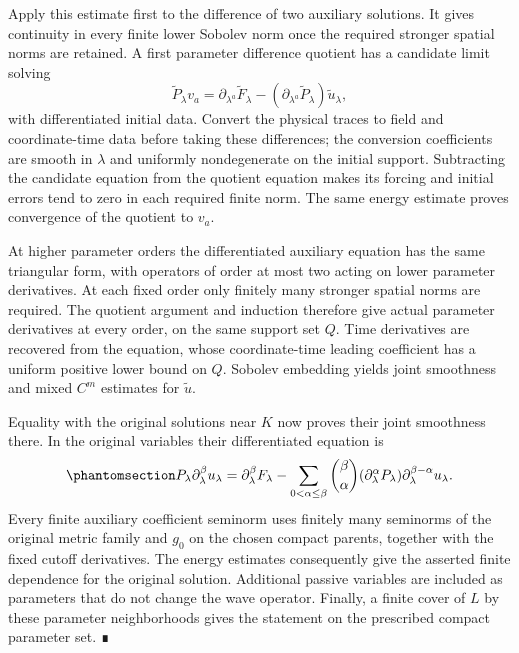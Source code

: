 \documentclass[
  english,
  11pt,
  reqno]{amsart}
\begin{document}
Apply this estimate first to the difference of two auxiliary solutions.
It gives continuity in every finite lower Sobolev norm once the required
stronger spatial norms are retained. A first parameter difference
quotient has a candidate limit solving \[
\widetilde P_\lambda v_a
=\partial_{\lambda^a}\widetilde F_\lambda
-(\partial_{\lambda^a}\widetilde P_\lambda)
\widetilde u_\lambda,
\] with differentiated initial data. Convert the physical traces to
field and coordinate-time data before taking these differences; the
conversion coefficients are smooth in \(\lambda\) and uniformly
nondegenerate on the initial support. Subtracting the candidate equation
from the quotient equation makes its forcing and initial errors tend to
zero in each required finite norm. The same energy estimate proves
convergence of the quotient to \(v_a\).

At higher parameter orders the differentiated auxiliary equation has the
same triangular form, with operators of order at most two acting on
lower parameter derivatives. At each fixed order only finitely many
stronger spatial norms are required. The quotient argument and induction
therefore give actual parameter derivatives at every order, on the same
support set \(Q\). Time derivatives are recovered from the equation,
whose coordinate-time leading coefficient has a uniform positive lower
bound on \(Q\). Sobolev embedding yields joint smoothness and mixed
\(C^m\) estimates for \(\widetilde u\).

Equality with the original solutions near \(K\) now proves their joint
smoothness there. In the original variables their differentiated
equation is
\begin{equation}\protect\phantomsection\label{eq:family-parameter-differentiated-wave}{
P_\lambda\partial_\lambda^\beta u_\lambda
=\partial_\lambda^\beta F_\lambda
 -\sum_{0<\alpha\le\beta}
  {\beta\choose\alpha}
  (\partial_\lambda^\alpha P_\lambda)
  \partial_\lambda^{\beta-\alpha}u_\lambda.
}\end{equation} Every finite auxiliary coefficient seminorm uses
finitely many seminorms of the original metric family and \(g_0\) on the
chosen compact parents, together with the fixed cutoff derivatives. The
energy estimates consequently give the asserted finite dependence for
the original solution. Additional passive variables are included as
parameters that do not change the wave operator. Finally, a finite cover
of \(L\) by these parameter neighborhoods gives the statement on the
prescribed compact parameter set. ∎
\end{document}
